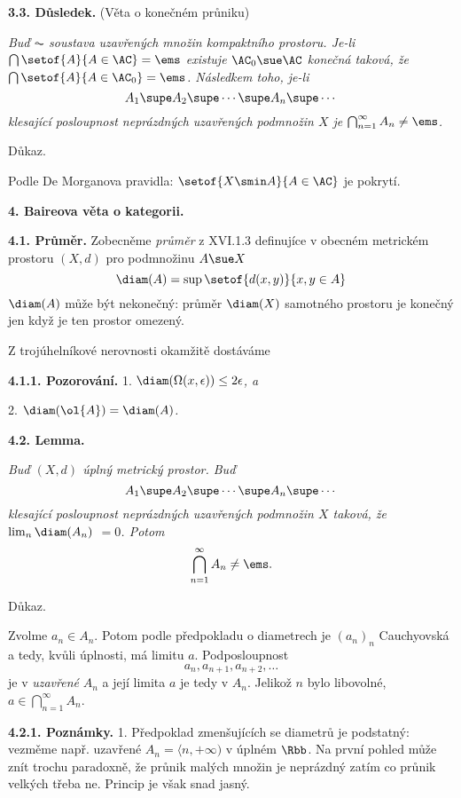 \documentclass[12pt]{article}
\begin{document}
  {\bf 3.3. Důsledek.} (Věta o konečném průniku) {\em Buď $\AC$ soustava uzavřených množin kompaktního prostoru. Je-li $\bigcap\setof{A}{A\in\AC}=\ems$ existuje $\AC_0\sue\AC$  konečná taková, že
  $\bigcap\setof{A}{A\in\AC_0}=\ems$. Následkem toho, je-li 
  $$
A_1\supe A_2\supe\cdots\supe A_n\supe\cdots
$$
klesající posloupnost neprázdných uzavřených podmnožin $X$ je
$\bigcap_{n=1}^\infty A_n\neq\ems$.

Důkaz.}  Podle De Morganova pravidla:  $\setof{X\smin A}{A\in\AC}$ je pokrytí.\sq

  
  
\vskip10mm
 
 {\large\bf 4. Baireova  věta o kategorii.}
 
 \bigskip
 
 {\bf 4.1. Průměr.} Zobecněme {\em průměr} z XVI.1.3 definujíce
v obecném metrickém prostoru $(X,d)$ pro podmnožinu $A\sue X$
 $$
 \diam(A)=\sup\setof{d(x,y)}{x,y\in A}
 $$
 $\diam(A)$ může být nekonečný: průměr $\diam(X)$ samotného prostoru je konečný jen když je ten prostor omezený.
 
 \medskip
 
 Z trojúhelníkové nerovnosti okamžitě dostáváme
 
 \smallskip
 
 {\bf 4.1.1. Pozorování.} 1. {\em $\diam(\Omega(x,\epsilon))\leq 2\epsilon$, a}
 
 2. {\em $\diam(\ol{A})=\diam(A)$.}
 
  
 \bigskip
 
 
 {\bf 4.2. Lemma.} {\em Buď $(X,d)$ úplný metrický prostor. Buď
$$
A_1\supe A_2\supe\cdots\supe A_n\supe\cdots
$$
klesající posloupnost neprázdných uzavřených podmnožin  $X$ taková, že  $\lim_n\diam(A_n)$ $=0$. Potom 
$$
\bigcap_{n=1}^\infty A_n\neq\ems.
$$

Důkaz.} Zvolme $a_n\in A_n$. Potom podle předpokladu o diametrech je $(a_n)_n$
Cauchyovská a tedy, kvůli úplnosti, má limitu $a$. Podposloupnost
$$ 
a_n,a_{n+1},a_{n+2},\dots
$$
je v {\em uzavřené} $A_n$ a její limita  $a$ je tedy v $A_n$. Jelikož $n$ bylo libovolné, $a\in \bigcap_{n=1}^\infty A_n$. \sq

\medskip

{\bf 4.2.1. Poznámky.} 1. Předpoklad zmenšujících se diametrů je podstatný: vezměme např.  uzavřené  $A_n=\langle n,+\infty)$ v úplném $\Rbb$. Na první pohled může znít trochu paradoxně, že průnik malých množin je neprázdný zatím co průnik velkých třeba ne. Princip je však snad jasný.
\end{document}
